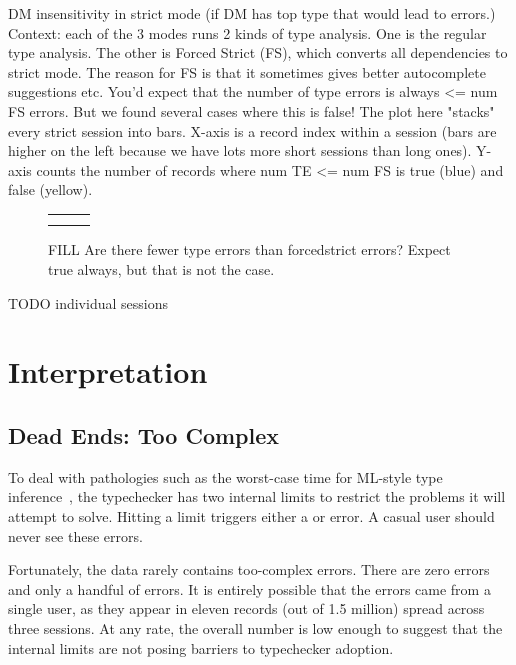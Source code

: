 \documentclass[english,submission,cleveref]{programming}
\begin{document}
DM insensitivity in strict mode
(if DM has top type that would lead to errors.)
Context: each of the 3 modes runs 2 kinds of type analysis. One is the regular
type analysis. The other is Forced Strict (FS), which converts all dependencies
to strict mode. The reason for FS is that it sometimes gives better
autocomplete suggestions etc.
You'd expect that the number of type errors is always <= num FS errors. But we
found several cases where this is false!
The plot here "stacks" every strict session into bars. X-axis is a record index
within a session (bars are higher on the left because we have lots more short
sessions than long ones). Y-axis counts the number of records where num TE <= num FS
is true (blue) and false (yellow).

\begin{figure}[t]\centering
  \begin{tabular}{lll}
    \mnocheck{} & \mnonstrict{} & \mstrict{} \\
    &
    &
  \end{tabular}
  \caption{FILL Are there fewer type errors than forcedstrict errors? Expect true always, but that is not the case.}
  \label{f:tefs}
\end{figure}

TODO individual sessions


\section{Interpretation}

\subsection{Dead Ends: Too Complex}

To deal with pathologies such as the worst-case time for ML-style type
inference~\cite{m-popl-1990,ktu-caap-1990}, the typechecker
has two internal limits to restrict the problems it will attempt to solve.
Hitting a limit triggers either a  or
 error.
A casual user should never see these errors.

Fortunately, the data rarely contains too-complex errors.
There are zero  errors and only a
handful of  errors.
It is entirely possible that the  errors came from
a single user, as they appear in eleven records (out of 1.5 million)
spread across three sessions.
At any rate, the overall number is low enough to suggest that the internal
limits are not posing barriers to typechecker adoption.
\end{document}
